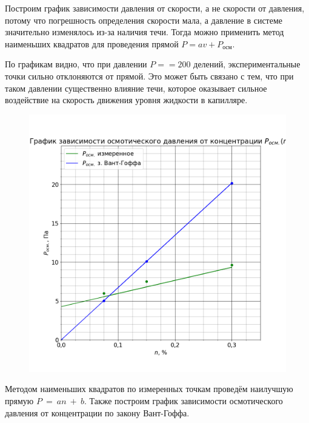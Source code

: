 Построим график зависимости давления от скорости, а не скорости от давления, потому что погрешность определения скорости мала, а давление в системе значительно изменялось из-за наличия течи. Тогда можно применить метод наименьших квадратов для проведения прямой $P = av + P_{осм}$.



По графикам видно, что при давлении $P == 200$ делений, экспериментальные точки сильно отклоняются от прямой. Это может быть связано с тем, что при таком давлении существенно влияние течи, которое оказывает сильное воздействие на скорость движения уровня жидкости в капилляре.

\begin{figure}[H]
	\centering
	\includegraphics[width=1 \textwidth]{../plots/graph_p_osm_n.png}
\end{figure}

Методом наименьших квадратов по измеренных точкам проведём наилучшую прямую $P~=~an~+~b$. Также построим график зависимости осмотического давления от концентрации по закону Вант-Гоффа.

